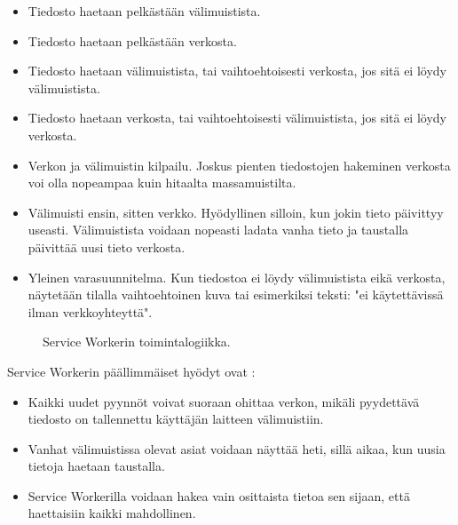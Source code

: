 \documentclass{tktltiki}
\begin{document}
\begin{itemize}
  \item Tiedosto haetaan pelkästään välimuistista.
  \item Tiedosto haetaan pelkästään verkosta.
  \item Tiedosto haetaan välimuistista, tai vaihtoehtoisesti verkosta, jos sitä ei löydy välimuistista.
  \item Tiedosto haetaan verkosta, tai vaihtoehtoisesti välimuistista, jos sitä ei löydy verkosta.
  \item Verkon ja välimuistin kilpailu. Joskus pienten tiedostojen hakeminen verkosta voi olla nopeampaa kuin hitaalta massamuistilta.
  \item Välimuisti ensin, sitten verkko. Hyödyllinen silloin, kun jokin tieto päivittyy useasti. Välimuistista voidaan nopeasti ladata vanha tieto ja taustalla päivittää uusi tieto verkosta.
  \item Yleinen varasuunnitelma. Kun tiedostoa ei löydy välimuistista eikä verkosta, näytetään tilalla vaihtoehtoinen kuva tai esimerkiksi teksti: "ei käytettävissä ilman verkkoyhteyttä".
\end{itemize}

\begin{figure}[h]
\begin{center}
\caption{Service Workerin toimintalogiikka. }
\label{Service workerin toiminta}
\end{center}
\end{figure}


Service Workerin päällimmäiset hyödyt ovat \cite{GoogleDevSummit}:

\begin{itemize}
  \item Kaikki uudet pyynnöt voivat suoraan ohittaa verkon, mikäli pyydettävä tiedosto on tallennettu käyttäjän laitteen välimuistiin.
  \item Vanhat välimuistissa olevat asiat voidaan näyttää heti, sillä aikaa, kun uusia tietoja haetaan taustalla.
  \item Service Workerilla voidaan hakea vain osittaista tietoa sen sijaan, että haettaisiin kaikki mahdollinen.
\end{itemize}
\end{document}
